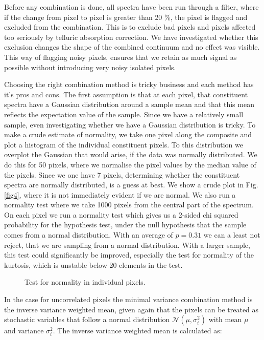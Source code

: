 \documentclass[iop]{emulateapj}
\begin{document}
Before any combination is done, all spectra have been run through a filter, where if the change from pixel to pixel is greater than 20 \%, the pixel is flagged and excluded from the combination. This is to exclude bad pixels and pixels affected too seriously by telluric absorption correction. We have investigated whether this exclusion changes the shape of the combined continuum and no effect was visible. This way of flagging noisy pixels, ensures that we retain as much signal as possible without introducing very noisy isolated pixels. 

Choosing the right combination method is tricky business and each method has it's pros and cons. The first assumption is that at each pixel, that constituent spectra have a Gaussian distribution around a sample mean and that this mean reflects the expectation value of the sample. Since we have a relatively small sample, even investigating whether we have a Gaussian distribution is tricky. To make a crude estimate of normality, we take one pixel along the composite and plot a histogram of the individual constituent pixels. To this distribution we overplot the Gaussian that would arise, if the data was normally distributed. We do this for 50 pixels, where we normalise the pixel values by the median value of the pixels. Since we one have 7 pixels, determining whether the constituent spectra are normally distributed, is a guess at best. We show a crude plot in Fig. \ref{fig4}, where it is not immediately evident if we are normal. We also run a normality test where we take 1000 pixels from the central part of the spectrum. On each pixel we run a normality test which gives us a 2-sided chi squared probability for the hypothesis test, under the null hypothesis that the sample comes from a normal distribution. With an average of $p = 0.31$ we can a least not reject, that we are sampling from a normal distribution. With a larger sample, this test could significantly be improved, especially the test for normality of the kurtosis, which is unstable below 20 elements in the test. 

 \begin{figure}
 \caption{Test for normality in individual pixels.\label{normality}}
 \end{figure}

In the case for uncorrelated pixels the minimal variance combination method is the inverse variance weighted mean, given again that the pixels can be treated as stochastic variables that follow a normal distribution $\mathcal{N}(\mu, \sigma_i^2)$ with mean $\mu$ and variance $\sigma_i^2$. The inverse variance weighted mean is calculated as:
\end{document}
